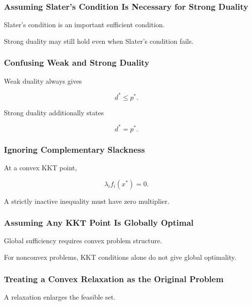 \subsubsection{Assuming Slater's Condition Is Necessary for Strong Duality}

Slater's condition is an important sufficient condition.

Strong duality may still hold even when Slater's condition fails.

\subsubsection{Confusing Weak and Strong Duality}

Weak duality always gives

\[
\boxed{
d^*\leq p^*.
}
\]

Strong duality additionally states

\[
\boxed{
d^*=p^*.
}
\]

\subsubsection{Ignoring Complementary Slackness}

At a convex KKT point,

\[
\boxed{
\lambda_i f_i(x^*)=0.
}
\]

A strictly inactive inequality must have zero multiplier.

\subsubsection{Assuming Any KKT Point Is Globally Optimal}

Global sufficiency requires convex problem structure.

For nonconvex problems, KKT conditions alone do not give global
optimality.

\subsubsection{Treating a Convex Relaxation as the Original Problem}

A relaxation enlarges the feasible set.

